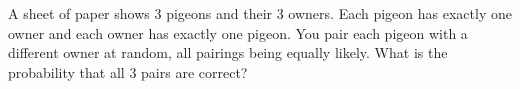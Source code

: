 A sheet of paper shows $3$ pigeons and their $3$ owners. Each pigeon has exactly one owner and each owner has exactly one pigeon. You pair each pigeon with a different owner at random, all pairings being equally likely. What is the probability that all $3$ pairs are correct?
